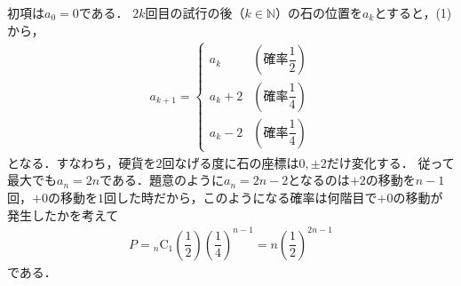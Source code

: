 \documentclass[../../main.tex]{subfiles}
\begin{document}
初項は$a_0=0$である．
$2k$回目の試行の後（$k\in\mathbb{N}$）の石の位置を$a_k$とすると，(1)から，
\begin{align}
  a_{k+1}=
  \begin{cases}
    a_k&(\text{確率}\dfrac{1}{2})\\
    a_k+2&(\text{確率}\dfrac{1}{4})\\
    a_k-2&(\text{確率}\dfrac{1}{4})
  \end{cases}
\end{align}
となる．すなわち，硬貨を$2$回なげる度に石の座標は$0,\pm 2$だけ変化する．
従って最大でも$a_n = 2n$である．題意のように$a_n=2n-2$となるのは$+2$の移動を$n-1$回，$+0$の移動を$1$回した時だから，このようになる確率は何階目で$+0$の移動が発生したかを考えて
\begin{align}
  P={}_n\mathrm{C}_1\left(\dfrac{1}{2}\right)\left(\dfrac{1}{4}\right)^{n-1}=n\left(\dfrac{1}{2}\right)^{2n-1}
\end{align}
である．

\newpage
\end{document}
